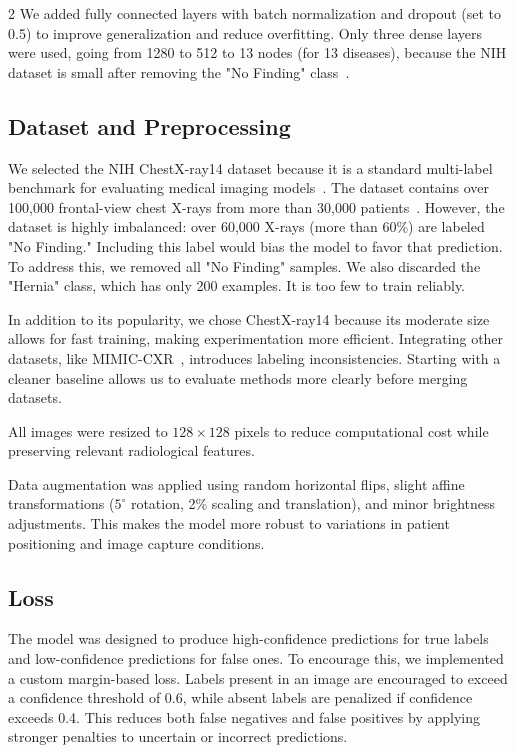\documentclass[12pt]{article}
\begin{document}
\begin{multicols}{2}
We added fully connected layers with batch normalization and dropout (set to 0.5) to improve generalization and reduce overfitting. Only three dense layers were used, going from 1280 to 512 to 13 nodes (for 13 diseases), because the NIH dataset is small after removing the "No Finding" class~\cite{nih_dataset}.

\subsection{Dataset and Preprocessing}

We selected the NIH ChestX-ray14 dataset because it is a standard multi-label benchmark for evaluating medical imaging models~\cite{wang2017chestx}. The dataset contains over 100,000 frontal-view chest X-rays from more than 30,000 patients~\cite{nih_dataset}. However, the dataset is highly imbalanced: over 60,000 X-rays (more than 60\%) are labeled "No Finding." Including this label would bias the model to favor that prediction. To address this, we removed all "No Finding" samples. We also discarded the "Hernia" class, which has only 200 examples. It is too few to train reliably.

In addition to its popularity, we chose ChestX-ray14 because its moderate size allows for fast training, making experimentation more efficient. Integrating other datasets, like MIMIC-CXR~\cite{mimic}, introduces labeling inconsistencies. Starting with a cleaner baseline allows us to evaluate methods more clearly before merging datasets.

All images were resized to $128\times128$ pixels to reduce computational cost while preserving relevant radiological features.

Data augmentation was applied using random horizontal flips, slight affine transformations ($5^{\circ}$ rotation, 2\% scaling and translation), and minor brightness adjustments. This makes the model more robust to variations in patient positioning and image capture conditions.

\subsection{Loss}

The model was designed to produce high-confidence predictions for true labels and low-confidence predictions for false ones. To encourage this, we implemented a custom margin-based loss. Labels present in an image are encouraged to exceed a confidence threshold of 0.6, while absent labels are penalized if confidence exceeds 0.4. This reduces both false negatives and false positives by applying stronger penalties to uncertain or incorrect predictions.


\end{multicols}
\end{document}
